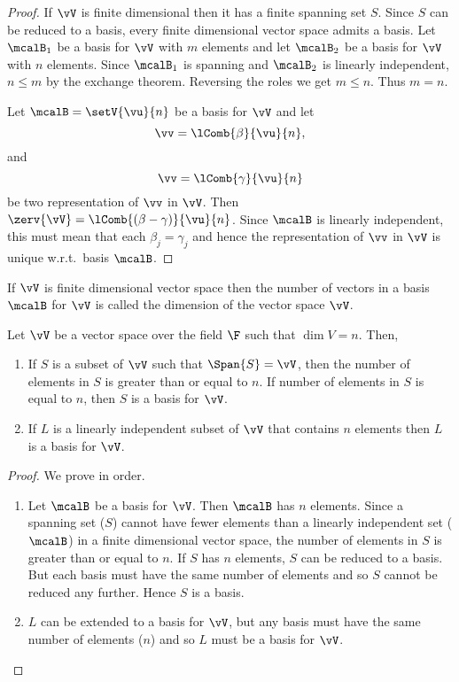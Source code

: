 \begin{proof}
    If $\vV$ is finite dimensional then it has a finite spanning set $S$. Since $S$ can be reduced to a basis,
    every finite dimensional vector space admits a basis.
    Let $\mcalB_{1}$ be a basis for $\vV$ with $m$ elements and let $\mcalB_{2}$ be a basis for $\vV$ with $n$
    elements. Since $\mcalB_{1}$ is spanning and $\mcalB_{2}$ is linearly independent, $n \leq m$ by the
    exchange theorem. Reversing the roles we get $m \leq n$. Thus $m =n$.

    Let $\mcalB = \setV{\vu}{n}$ be a basis for $\vV$ and let
    \[\vv = \lComb{\beta}{\vu}{n},\]
    and
    \[\vv = \lComb{\gamma}{\vu}{n}\]
    be two representation of $\vv$ in $\vV$. Then $\zerv{\vV} = \lComb{(\beta-\gamma)}{\vu}{n}$. Since
    $\mcalB$ is linearly independent, this must mean that each $\beta_j = \gamma_j$ and hence the
    representation of $\vv$ in $\vV$ is unique w.r.t.~basis $\mcalB$.
\end{proof}
\begin{Definition}[name=Dimension]
    If $\vV$ is finite dimensional vector space then the number of vectors in a basis $\mcalB$ for $\vV$ is
    called the dimension of the vector space $\vV$.
\end{Definition}
\begin{Proposition}
    Let $\vV$ be a vector space over the field $\F$ such that $\dim{V} = n$. Then,
    \begin{enumerate}
	\item
	    If $S$ is a subset of $\vV$ such that $\Span{S} = \vV$, then the number of elements in $S$ is
	    greater than or equal to $n$. If number of elements in $S$ is equal to $n$, then $S$ is a basis
	    for $\vV$.
	\item
	    If $L$ is a linearly independent subset of $\vV$ that contains $n$ elements then $L$ is a basis
	    for $\vV$.
    \end{enumerate}
\end{Proposition}
\begin{proof}
    We prove in order.
    \begin{enumerate}
	\item
	    Let $\mcalB$ be a basis for $\vV$. Then $\mcalB$ has $n$ elements. Since a spanning set ($S$) cannot
	    have fewer elements than a linearly independent set ($\mcalB$) in a finite dimensional vector
	    space, the number of elements in $S$ is
	    greater than or equal to $n$. If $S$ has $n$ elements, $S$ can be reduced to a basis. But each
	    basis must have the same number of elements and so $S$ cannot be reduced any further. Hence $S$ is
	    a basis.
	\item
	    $L$ can be extended to a basis for $\vV$, but any basis must have the same number of elements
	    ($n$) and so $L$ must be a basis for $\vV$.
    \end{enumerate}
\end{proof}
